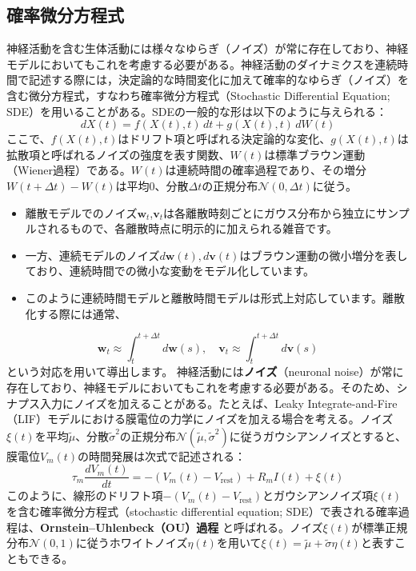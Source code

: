 \subsection{確率微分方程式}
神経活動を含む生体活動には様々なゆらぎ（ノイズ）が常に存在しており、神経モデルにおいてもこれを考慮する必要がある。神経活動のダイナミクスを連続時間で記述する際には，決定論的な時間変化に加えて確率的なゆらぎ（ノイズ）を含む微分方程式，すなわち確率微分方程式（Stochastic Differential Equation; SDE）を用いることがある。SDEの一般的な形は以下のように与えられる：
\begin{equation}
dX(t) = f(X(t), t)\,dt + g(X(t), t)\,dW(t)
\end{equation}
ここで、$f(X(t), t)$はドリフト項と呼ばれる決定論的な変化、$g(X(t), t)$は拡散項と呼ばれるノイズの強度を表す関数、$W(t)$は標準ブラウン運動（Wiener過程）である。$W(t)$は連続時間の確率過程であり、その増分$W(t + \Delta t) - W(t)$は平均0、分散$\Delta t$の正規分布$\mathcal{N}(0, \Delta t)$に従う。
\begin{itemize}
\item 離散モデルでのノイズ$\mathbf{w}_t$,$\mathbf{v}_t$は各離散時刻ごとにガウス分布から独立にサンプルされるもので、各離散時点に明示的に加えられる雑音です。
\item 一方、連続モデルのノイズ$d\mathbf{w}(t), d\mathbf{v}(t)$はブラウン運動の微小増分を表しており、連続時間での微小な変動をモデル化しています。
\item このように連続時間モデルと離散時間モデルは形式上対応しています。離散化する際には通常、
\end{itemize}
\begin{equation}
\mathbf{w}_{t} \approx \int_{t}^{t+\Delta t} d\mathbf{w}(s),\quad
\mathbf{v}_{t} \approx \int_{t}^{t+\Delta t} d\mathbf{v}(s)
\end{equation}
という対応を用いて導出します。
神経活動には\textbf{ノイズ}（neuronal noise）が常に存在しており、神経モデルにおいてもこれを考慮する必要がある。そのため、シナプス入力にノイズを加えることがある。たとえば、Leaky Integrate-and-Fire（LIF）モデルにおける膜電位の力学にノイズを加える場合を考える。ノイズ$\xi(t)$を平均$\tilde{\mu}$、分散$\tilde{\sigma}^2$の正規分布$\mathcal{N}(\tilde{\mu}, \tilde{\sigma}^2)$に従うガウシアンノイズとすると、膜電位$V_m(t)$の時間発展は次式で記述される：
\begin{equation}
\tau_m \frac{dV_m(t)}{dt} = -(V_m(t) - V_\text{rest}) + R_m I(t) + \xi(t)
\end{equation}
このように、線形のドリフト項$-(V_m(t) - V_\text{rest})$とガウシアンノイズ項$\xi(t)$を含む確率微分方程式（stochastic differential equation; SDE）で表される確率過程は、\textbf{Ornstein–Uhlenbeck（OU）過程} と呼ばれる。ノイズ$\xi(t)$が標準正規分布$\mathcal{N}(0, 1)$に従うホワイトノイズ$\eta(t)$を用いて$\xi(t) = \tilde{\mu} + \tilde{\sigma} \eta(t)$と表すこともできる。
